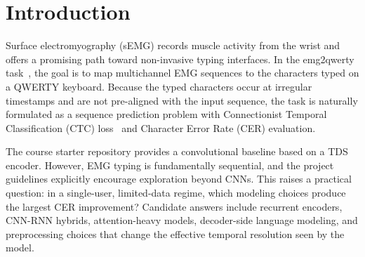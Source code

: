 
\begin{abstract}
We study single-user EMG-to-QWERTY decoding on the emg2qwerty dataset and ask which modeling choices matter most in a small-data regime. Starting from the course TDS CNN baseline, we compare recurrent, hybrid, and attention-heavy architectures, then run ablations over temporal resolution, context design, recurrent architecture, and data availability. The main empirical pattern is that efficient recurrent models outperform both the baseline CNN and larger attention-heavy alternatives, while lower effective frame rate and longer temporal context improve generalization. On the best spectrogram-based encoder, beam search with a 6-gram character language model reduces test CER from 14.11 to 8.69. Guided by the hop-length ablation, we then replace the handcrafted spectrogram with a learned-downsampling Raw-CNN+BiGRU: a three-layer strided CNN whose total stride matches the previously optimal 48x temporal downsampling, followed by a two-layer BiGRU. This Raw-CNN+BiGRU becomes the strongest greedy encoder we observed, reaching 9.933 validation CER and 11.476 test CER, and its best decoded test result further improves to 6.938. Overall, the project suggests that in this single-user setting, compact recurrent sequence modeling and learned temporal compression matter more than simply increasing model size or attention capacity.
\end{abstract}

\section{Introduction}

Surface electromyography (sEMG) records muscle activity from the wrist and offers a promising path toward non-invasive typing interfaces. In the emg2qwerty task~\cite{sivakumar2024emg2qwerty}, the goal is to map multichannel EMG sequences to the characters typed on a QWERTY keyboard. Because the typed characters occur at irregular timestamps and are not pre-aligned with the input sequence, the task is naturally formulated as a sequence prediction problem with Connectionist Temporal Classification (CTC) loss~\cite{graves2006ctc} and Character Error Rate (CER) evaluation.

The course starter repository provides a convolutional baseline based on a TDS encoder. However, EMG typing is fundamentally sequential, and the project guidelines explicitly encourage exploration beyond CNNs. This raises a practical question: in a single-user, limited-data regime, which modeling choices produce the largest CER improvement? Candidate answers include recurrent encoders, CNN-RNN hybrids, attention-heavy models, decoder-side language modeling, and preprocessing choices that change the effective temporal resolution seen by the model.

